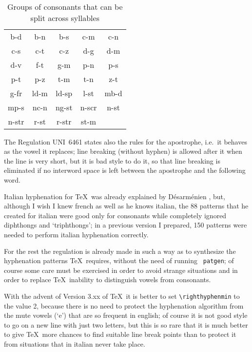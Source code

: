 \begin{table}{\centering\tt
\begin{tabular}{|*5{c|}}\hline
b-d  & b-n  & b-s  & c-m  & c-n  \\
c-s  & c-t  & c-z  & d-g  & d-m  \\
d-v  & f-t  & g-m  & p-n  & p-s  \\
p-t  & p-z  & t-m  & t-n  & z-t  \\
g-fr & ld-m & ld-sp& l-st & mb-d \\
mp-s & nc-n & ng-st& n-scr& n-st \\
n-str& r-st & r-str& st-m &      \\
\hline
\end{tabular}\par}
\caption{Groups    of   consonants  that  can  be  split  across  syllables}
\label{t:6461} 
 \end{table}

The  Regulation  UNI~6461 states also the rules for the apostrophe, i.e.\ it
behaves as the vowel it replaces; line breaking (without hyphen) is  allowed
after  it when the line is very short, but it is bad style to do it, so that
line breaking is eliminated if  no  interword  space  is  left  between  the
apostrophe  and  the  following  word.


Italian  hyphenation  for  \TeX\  was  already  explained by D\'esarm\'enien
\cite{desarmenien}, but, although I wish I knew french as well as  he  knows
italian,  the  88  patterns  that  he created for italian were good only for
consonants while completely  ignored  diphthongs  and  `triphthongs';  in  a
previous  version  I  prepared,  150 patterns were needed to perform italian
hyphenation correctly.

For  the  rest the regulation is already made in such a way as to synthesize
the hyphenation patterns \TeX\ requires, without the need  of  running  {\tt
patgen};  of  course  some  care must be exercised in order to avoid strange
situations and in order to replace \TeX\  inability  to  distinguish  vowels
from consonants.

With    the    advent  of  Version  3.xx  of  \TeX\  it  is  better  to  set
\verb"\righthyphenmin" to the value 2, because there is no need  to  protect
the hyphenation algorithm from the mute vowels (`e') that are so frequent in
english; of course it is not good style to go on a new line  with  just  two
letters,  but  this  is  so  rare  that it is much better to give \TeX\ more
chances to  find  suitable  line  break  points  than  to  protect  it  from
situations that in italian never take place.

